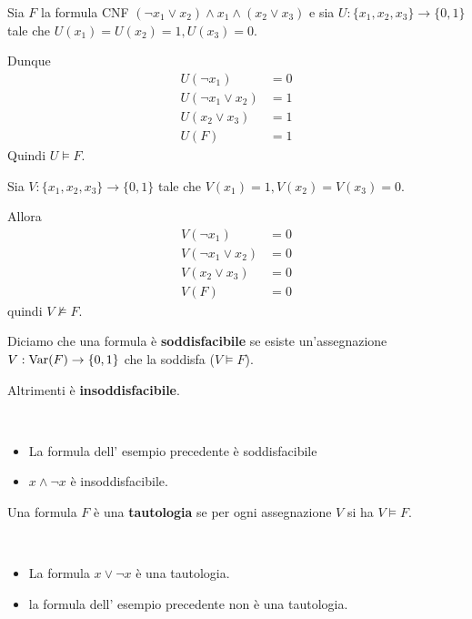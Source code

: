 \documentclass[../main.tex]{subfiles}
\begin{document}
\begin{example}
    Sia $F$ la formula CNF $(\neg x_1 \lor x_2) \land x_1 \land (x_2 \lor x_3)$ e sia $U: \{x_1,x_2,x_3\} \rightarrow \{0,1\}$ tale che $U(x_1) = U(x_2) = 1, U(x_3) = 0$.

    Dunque
    \begin{align*}
        U(\neg x_1)          & = 0 \\
        U(\neg x_1 \lor x_2) & = 1 \\
        U(x_2 \lor x_3)      & = 1 \\
        U(F)                 & = 1
    \end{align*}
    Quindi $U \vDash F$.

    Sia $V: \{x_1,x_2,x_3\} \rightarrow \{0,1\}$ tale che $V(x_1) = 1, V(x_2) = V(x_3) = 0$.

    Allora
    \begin{align*}
        V(\neg x_1)          & = 0 \\
        V(\neg x_1 \lor x_2) & = 0 \\
        V(x_2 \lor x_3)      & = 0 \\
        V(F)                 & = 0
    \end{align*}
    quindi $V \nvDash F$.
\end{example}

\begin{definition}
    Diciamo che una formula è \textbf{soddisfacibile} se esiste un'assegnazione $V: \operatorname{Var} (F) \rightarrow \{0,1\}$ che la soddisfa ($V \vDash F$).

    Altrimenti è \textbf{insoddisfacibile}.
\end{definition}
\begin{example}\
    \begin{itemize}
        \item La formula dell' esempio precedente è soddisfacibile
        \item $x \land \neg x$ è insoddisfacibile.
    \end{itemize}
\end{example}
\begin{definition}[Tautologia]
    Una formula $F$ è una \textbf{tautologia} se per ogni assegnazione $V$ si ha $V \vDash F$.
\end{definition}
\begin{example}\
    \begin{itemize}
        \item La formula $x \lor \neg x$ è una tautologia.
        \item la formula dell' esempio precedente non è una tautologia.
    \end{itemize}
\end{example}
\end{document}
